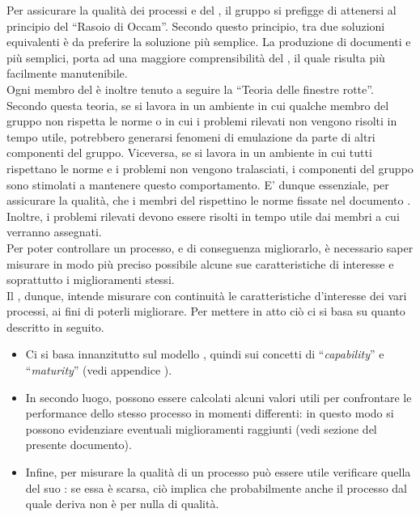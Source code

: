 			Per assicurare la qualità dei processi e del , il gruppo \groupname{} si prefigge di attenersi al principio del “Rasoio di Occam”. Secondo questo principio, tra due soluzioni equivalenti è da preferire la soluzione più semplice. La produzione di documenti e  più semplici, porta ad una maggiore comprensibilità del , il quale risulta più facilmente manutenibile.\\
			Ogni membro del  è inoltre tenuto a seguire la “Teoria delle finestre rotte”. Secondo questa teoria, se si lavora in un ambiente in cui qualche membro del gruppo non rispetta le norme o in cui i problemi rilevati non vengono risolti in tempo utile, potrebbero generarsi fenomeni di emulazione da parte di altri componenti del gruppo. Viceversa, se si lavora in un ambiente in cui tutti rispettano le norme e i problemi non vengono tralasciati, i componenti del gruppo sono stimolati a mantenere questo comportamento. E' dunque essenziale, per assicurare la qualità, che i membri del  rispettino le norme fissate nel documento . Inoltre, i problemi rilevati devono essere risolti in tempo utile dai membri a cui verranno assegnati.\\
			Per poter controllare un processo, e di conseguenza migliorarlo, è necessario saper misurare in modo più preciso possibile alcune sue caratteristiche di interesse e soprattutto i miglioramenti stessi.\\
			Il , dunque, intende misurare con continuità le caratteristiche d'interesse dei vari processi, ai fini di poterli migliorare. Per mettere in atto ciò ci si basa su quanto descritto in seguito.
			\begin{itemize}
				\item Ci si basa innanzitutto sul modello , quindi sui concetti di “\textit{capability}” e “\textit{maturity}” (vedi appendice ).
				\item In secondo luogo, possono essere calcolati alcuni valori utili per confrontare le performance dello stesso processo in momenti differenti: in questo modo si possono evidenziare eventuali miglioramenti raggiunti (vedi sezione  del presente documento).
				\item Infine, per misurare la qualità di un processo può essere utile verificare quella del suo : se essa è scarsa, ciò implica che probabilmente anche il processo dal quale deriva non è per nulla di qualità.
			\end{itemize}
